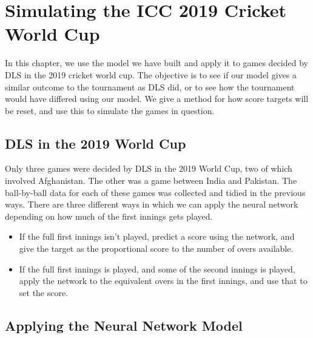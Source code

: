 \chapter{Simulating the ICC 2019 Cricket World Cup}
In this chapter, we use the model we have built and apply it to games decided by DLS in the 2019 cricket world cup. The objective is to see if our model 
gives a similar outcome to the tournament as DLS did, or to see how the tournament would have differed using our model. We give a method for how score targets will
be reset, and use this to simulate the games in question. 

\section{DLS in the 2019 World Cup}
Only three games were decided by DLS in the 2019 World Cup, two of which involved Afghanistan. The other was a game between India and Pakistan. The ball-by-ball data for 
each of these games was collected and tidied in the previous ways. There are three different ways in which we can apply the neural network depending on how much of the first innings gets played.

\begin{itemize}
    \item If the full first innings isn't played, predict a score using the network, and give the target as the proportional score to the number of overs available. 
    \item If the full first innings is played, and some of the second innings is played, apply the network to the equivalent overs in the first innings, and use that to set the score. 
\end{itemize}


\section{Applying the Neural Network Model}
